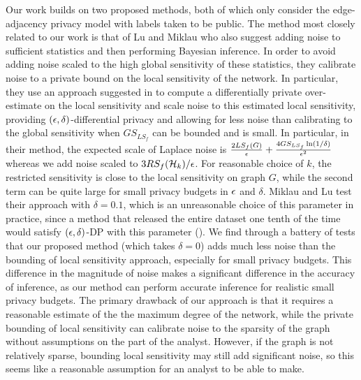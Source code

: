Our work builds on two proposed methods, both of which only consider the edge-adjacency privacy model with labels taken to be public. The method most closely related to our work is that of Lu and Miklau \cite{LM14} who also suggest adding noise to sufficient statistics and then performing Bayesian inference. In order to avoid adding noise scaled to the high global sensitivity of these statistics, they calibrate noise to a private bound on the local sensitivity of the network. In particular, they use an approach suggested in \cite{KRSY14} to compute a differentially private over-estimate on the local sensitivity and scale noise to this estimated local sensitivity, providing $(\epsilon, \delta)$-differential privacy and allowing for less noise than calibrating to the global sensitivity when  $GS_{LS_f}$ can be bounded and is small. In particular, in their method, the expected scale of Laplace noise is $\frac{2 LS_f(G)}{\epsilon} + \frac{4 GS_{LS_f} \ln (1/\delta)}{\epsilon^2}$ whereas we add noise scaled to $3RS_f(\mathcal{H}_k)/\epsilon$. For reasonable choice of $k$, the restricted sensitivity is close to the local sensitivity on graph $G$, while the second term can be quite large for small privacy budgets in $\epsilon$ and $\delta$. Miklau and Lu test their approach with $\delta = 0.1$, which is an unreasonable choice of this parameter in practice, since a method that released the entire dataset one tenth of the time would satisfy $(\epsilon, \delta)$-DP with this parameter ().  We find through a battery of tests that our proposed method (which takes $\delta = 0$) adds much less noise than the bounding of local sensitivity approach, especially for small privacy budgets. This difference in the magnitude of noise makes a significant difference in the accuracy of inference, as our method can perform accurate inference for realistic small privacy budgets. The primary drawback of our approach is that it requires a reasonable estimate of the the maximum degree of the network, while the private bounding of local sensitivity can calibrate noise to the sparsity of the graph without assumptions on the part of the analyst. However, if the graph is not relatively sparse, bounding local sensitivity may still add significant noise, so this seems like a reasonable assumption for an analyst to be able to make.

